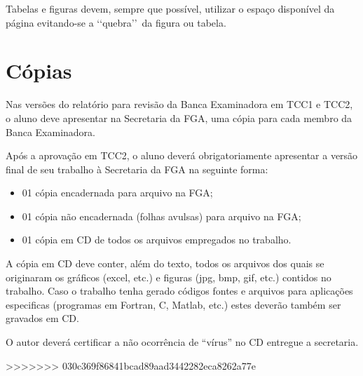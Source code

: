 Tabelas e figuras devem, sempre que possível, utilizar o espaço disponível 
da página evitando-se a \lq\lq quebra\rq\rq\ da figura ou tabela. 

\section{Cópias}

Nas versões do relatório para revisão da Banca Examinadora em TCC1 e TCC2, 
o aluno deve apresentar na Secretaria da FGA, uma cópia para cada membro da 
Banca Examinadora.

Após a aprovação em TCC2, o aluno deverá obrigatoriamente apresentar a 
versão final de seu trabalho à Secretaria da FGA na seguinte forma:

\begin{itemize}
	\item 01 cópia encadernada para arquivo na FGA;
	\item 01 cópia não encadernada (folhas avulsas) para arquivo na FGA;
	\item 01 cópia em CD de todos os arquivos empregados no trabalho.
\end{itemize}

A cópia em CD deve conter, além do texto, todos os arquivos dos quais se 
originaram os gráficos (excel, etc.) e figuras (jpg, bmp, gif, etc.) 
contidos no trabalho. Caso o trabalho tenha gerado códigos fontes e 
arquivos para aplicações especificas (programas em Fortran, C, Matlab, 
etc.) estes deverão também ser gravados em CD. 

O autor deverá certificar a não ocorrência de “vírus” no CD entregue a 
secretaria. 

>>>>>>> 030c369f86841bcad89aad3442282eca8262a77e
